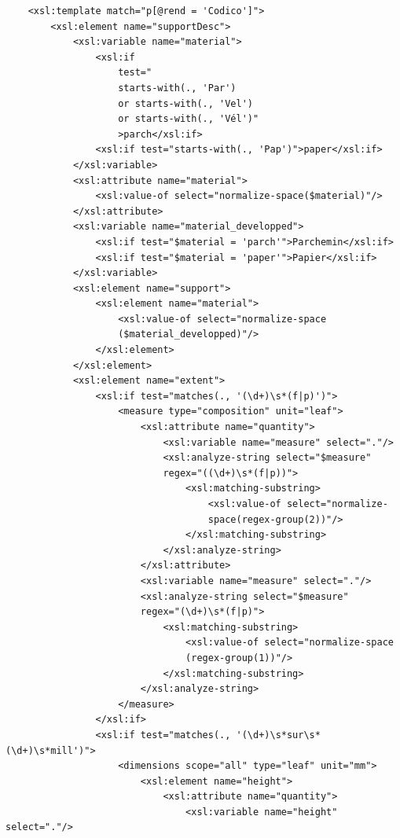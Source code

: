 \documentclass[a4paper,12pt,twoside]{book}
\begin{document}
\begin{verbatim}
    <xsl:template match="p[@rend = 'Codico']">
        <xsl:element name="supportDesc">
            <xsl:variable name="material">
                <xsl:if
                    test="
                    starts-with(., 'Par')
                    or starts-with(., 'Vel')
                    or starts-with(., 'Vél')"
                    >parch</xsl:if>
                <xsl:if test="starts-with(., 'Pap')">paper</xsl:if>
            </xsl:variable>
            <xsl:attribute name="material">
                <xsl:value-of select="normalize-space($material)"/>
            </xsl:attribute>
            <xsl:variable name="material_developped">
                <xsl:if test="$material = 'parch'">Parchemin</xsl:if>
                <xsl:if test="$material = 'paper'">Papier</xsl:if>
            </xsl:variable>
            <xsl:element name="support">
                <xsl:element name="material">
                    <xsl:value-of select="normalize-space
                    ($material_developped)"/>
                </xsl:element>
            </xsl:element>
            <xsl:element name="extent">
                <xsl:if test="matches(., '(\d+)\s*(f|p)')">
                    <measure type="composition" unit="leaf">
                        <xsl:attribute name="quantity">
                            <xsl:variable name="measure" select="."/>
                            <xsl:analyze-string select="$measure" 
                            regex="((\d+)\s*(f|p))">
                                <xsl:matching-substring>
                                    <xsl:value-of select="normalize-
                                    space(regex-group(2))"/>
                                </xsl:matching-substring>
                            </xsl:analyze-string>
                        </xsl:attribute>
                        <xsl:variable name="measure" select="."/>
                        <xsl:analyze-string select="$measure" 
                        regex="(\d+)\s*(f|p)">
                            <xsl:matching-substring>
                                <xsl:value-of select="normalize-space
                                (regex-group(1))"/>
                            </xsl:matching-substring>
                        </xsl:analyze-string>
                    </measure>
                </xsl:if>
                <xsl:if test="matches(., '(\d+)\s*sur\s*(\d+)\s*mill')">
                    <dimensions scope="all" type="leaf" unit="mm">
                        <xsl:element name="height">
                            <xsl:attribute name="quantity">
                                <xsl:variable name="height" select="."/>

\end{verbatim}
\end{document}
